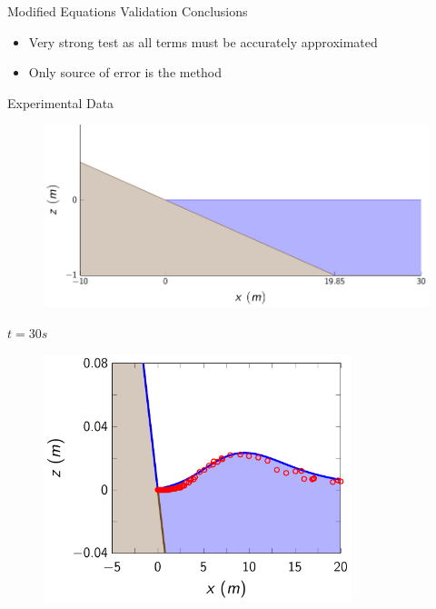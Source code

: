 \documentclass[]{beamer}
\begin{document}
\begin{frame}{Modified Equations Validation Conclusions}
\begin{itemize}
	\item Very strong test as all terms must be accurately approximated
	\item Only source of error is the method
\end{itemize}
\end{frame}

	
\begin{frame}{Experimental Data}
	\begin{figure}
		\includegraphics[width=1\textwidth]{./Pics/DryBed/Syn/WavetankArtificalPres.pdf}
	\end{figure}
\end{frame}

\begin{frame}{$t=30s$}
	\begin{figure}
		\includegraphics[width=0.8\textwidth]{./Pics/DryBed/Syn/t=30s.pdf}
	\end{figure}
\end{frame}
\end{document}
